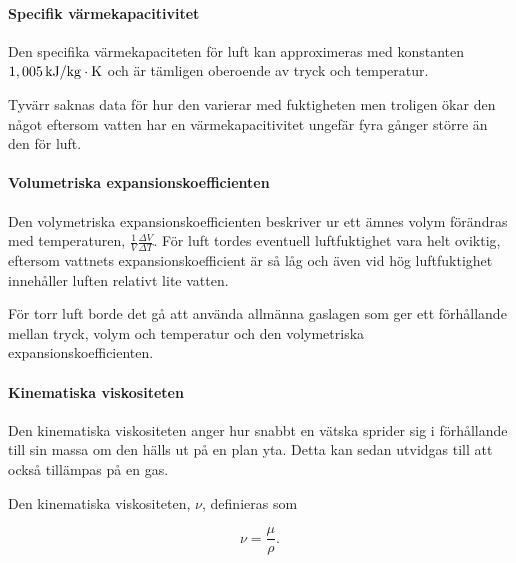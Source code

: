 
\paragraph{Specifik värmekapacitivitet}
Den specifika värmekapaciteten för luft kan approximeras med konstanten $\unit[1,005]{kJ/kg\cdot K}$ och är tämligen oberoende av tryck och temperatur.\cite{engineeringtoolbox}

Tyvärr saknas data för hur den varierar med fuktigheten men troligen ökar den något eftersom vatten har en värmekapacitivitet ungefär fyra gånger större än den för luft.


\paragraph{Volumetriska expansionskoefficienten} %
Den volymetriska expansionskoefficienten beskriver ur ett ämnes volym förändras med temperaturen, $\frac{1}{V}\frac{\Delta V}{\Delta T}$. För luft tordes eventuell luftfuktighet vara helt oviktig, eftersom vattnets expansionskoefficient är så låg och även vid hög luftfuktighet innehåller luften relativt lite vatten.

För torr luft borde det gå att använda allmänna gaslagen som ger ett förhållande mellan tryck, volym och temperatur och den volymetriska expansionskoefficienten.%




\paragraph{Kinematiska viskositeten} %
Den kinematiska viskositeten anger hur snabbt en vätska sprider sig i förhållande till sin massa om den hälls ut på en plan yta. Detta kan sedan utvidgas till att också tillämpas på en gas.

Den kinematiska viskositeten, $\nu$, definieras som \cite{kinematiskviskositet}

\begin{equation}
\nu = \frac {\mu} {\rho}.
\end{equation}

